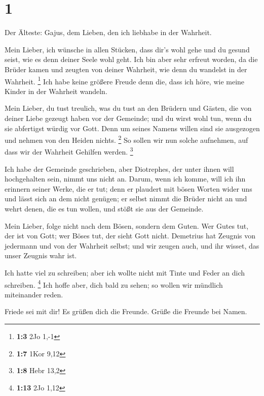 \hypertarget{section}{%
\section{1}\label{section}}

 Der Älteste: Gajus, dem Lieben, den ich liebhabe in der
Wahrheit.

 Mein Lieber, ich wünsche in allen Stücken, dass dir's
wohl gehe und du gesund seist, wie es denn deiner Seele wohl geht.
 Ich bin aber sehr erfreut worden, da die Brüder kamen und
zeugten von deiner Wahrheit, wie denn du wandelst in der Wahrheit.
\footnote{\textbf{1:3} 2Jo 1,-1}  Ich habe keine größere
Freude denn die, dass ich höre, wie meine Kinder in der Wahrheit
wandeln.

 Mein Lieber, du tust treulich, was du tust an den Brüdern
und Gästen,  die von deiner Liebe gezeugt haben vor der
Gemeinde; und du wirst wohl tun, wenn du sie abfertigst würdig vor Gott.
 Denn um seines Namens willen sind sie ausgezogen und
nehmen von den Heiden nichts. \footnote{\textbf{1:7} 1Kor 9,12}
 So sollen wir nun solche aufnehmen, auf dass wir der
Wahrheit Gehilfen werden. \footnote{\textbf{1:8} Hebr 13,2}

 Ich habe der Gemeinde geschrieben, aber Diotrephes, der
unter ihnen will hochgehalten sein, nimmt uns nicht an. 
Darum, wenn ich komme, will ich ihn erinnern seiner Werke, die er tut;
denn er plaudert mit bösen Worten wider uns und lässt sich an dem nicht
genügen; er selbst nimmt die Brüder nicht an und wehrt denen, die es tun
wollen, und stößt sie aus der Gemeinde.

 Mein Lieber, folge nicht nach dem Bösen, sondern dem
Guten. Wer Gutes tut, der ist von Gott; wer Böses tut, der sieht Gott
nicht.  Demetrius hat Zeugnis von jedermann und von der
Wahrheit selbst; und wir zeugen auch, und ihr wisset, das unser Zeugnis
wahr ist.

 Ich hatte viel zu schreiben; aber ich wollte nicht mit
Tinte und Feder an dich schreiben. \footnote{\textbf{1:13} 2Jo 1,12}
 Ich hoffe aber, dich bald zu sehen; so wollen wir
mündlich miteinander reden.

 Friede sei mit dir! Es grüßen dich die Freunde. Grüße
die Freunde bei Namen.
